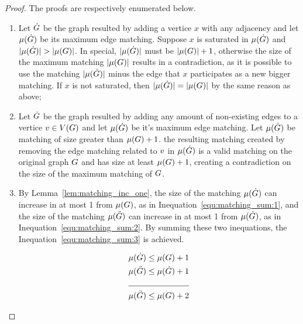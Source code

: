\documentclass[msc,english,table,xcdraw]{ppgccufmg}
\begin{document}
\begin{proof}
The proofs are respectively enumerated below.
    \begin{enumerate}
        \item Let $\dot{G}$ be the graph resulted by adding a vertice $x$ with any 
adjacency and let $\mu(\dot{G})$ be its maximum edge matching.
Suppose $x$ is saturated in $\mu(\dot{G})$ and $|\mu(\dot{G})| > |\mu(G)|$. 
In special, $|\mu(\dot{G})|$ must be $|\mu(G)| + 1$, otherwise the size of the maximum matching $|\mu(G)|$ results in a contradiction, as it is possible to use the matching 
$|\mu(\dot{G})|$ minus the edge that $x$ participates as a 
new bigger matching.
If $x$ is not saturated, then $|\mu(\dot{G})| = |\mu(G)|$ by the same reason as above;
        \item Let $\dot{G}$ be the graph resulted by adding any amount of non-existing 
edges to a vertice $v \in V(G)$ and let $\mu(\dot{G})$ be it's 
maximum edge matching.
Let $\mu(\dot{G})$ be matching of size greater than $\mu(G) + 1$.
the resulting matching created by removing the edge matching related to $v$ in 
$\mu(\dot{G})$ is a valid matching on the original graph $G$ and has
size at least $\mu(G) + 1$, creating a contradiction on the size of the maximum
matching of $G$.
        \item By Lemma~\ref{lem:matching_inc_one}, the size of the matching 
        $\mu(\dot{G})$ can increase in at most 1 from $\mu(G)$,
        as in Inequation~\ref{equ:matching_sum:1}, and the size of the matching $\mu(\ddot{G})$ can increase in at most 1 from $\mu(\dot{G})$, as in
        Inequation~\ref{equ:matching_sum:2}.
        By summing these two inequations, the Inequation~\ref{equ:matching_sum:3} is achieved.
        
            \begin{alignat}{2}
            \centering
            &\matchingOf{\sub {\graphG}} \leq \matchingOf{\graphG} + 1 \label{equ:matching_sum:1}\\
            &\matchingOf{\ssub{\graphG}} \leq \matchingOf{\sub{\graphG}} + 1 \label{equ:matching_sum:2}\\ 
            \cline{1-2}
            &\matchingOf{\ssub{\graphG}} \leq \matchingOf{\graphG} + 2 \label{equ:matching_sum:3}
            \end{alignat}
    \end{enumerate}
\end{proof}
\end{document}
